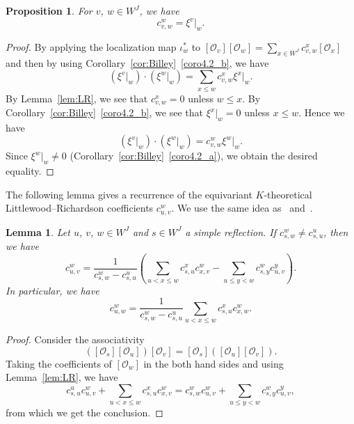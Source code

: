 \documentclass[10pt]{amsart}
\newtheorem{prop}[theo]{Proposition}
\newtheorem{lemm}[theo]{Lemma}
\theoremstyle{definition}
\theoremstyle{remark}
\newcommand\OO{\mathcal{O}}
\begin{document}
\begin{prop}
\label{prop:LR=xi}
For $v$, $w \in W^J$, we have
\begin{equation}
\label{eq:LR=xi}
c^w_{v,w} = \xi^v|_w.
\end{equation}
\end{prop}

\begin{proof}
By applying the localization map $\iota_w^*$ to 
$[\OO_v] [\OO_w] = \sum_{x \in W^J} c^x_{v,w} [\OO_x]$ 
and then by using Corollary~\ref{cor:Billey}~\ref{coro4.2_b}, we have
$$
\left( \xi^v|_w \right) \cdot \left( \xi^w|_w \right)
 =
\sum_{x \le w} c^x_{v,w} \xi^x|_w.
$$
By Lemma~\ref{lem:LR}, we see that $c^x_{v,w} = 0$ unless $w \le x$.
By Corollary~\ref{cor:Billey}~\ref{coro4.2_b}, we see that $\xi^x|_w = 0$ unless $x \le w$.
Hence we have
$$
\left( \xi^v|_w \right) \cdot \left( \xi^w|_w \right)
 =
c^w_{v,w} \xi^w|_w.
$$
Since $\xi^w|_w \neq 0$ (Corollary~\ref{cor:Billey}~\ref{coro4.2_a}), we obtain the desired equality.
\end{proof}

The following lemma gives a recurrence of the equivariant $K$-theoretical 
Little\-wood--Richardson coefficients $c^w_{u,v}$.
We use the same idea as~\cite[Corollary~6.5]{M} and~\cite[Proposition~3.1]{PY}.

\begin{lemm}
\label{lem:recLR}
Let $u$, $v$, $w \in W^J$ and $s \in W^J$ a simple reflection.
If $c^w_{s,w} \neq c^u_{s,u}$, then we have
$$
c^w_{u,v}
 =
\frac{ 1 }
 { c^w_{s,w} - c^u_{s,u} }
\left(
 \sum_{u < x \le w} c^x_{s,u} c^w_{x,v}
 -
 \sum_{u \le y < w} c^w_{s,y} c^y_{u,v}
\right).
$$
In particular, we have
\begin{equation}
\label{eq:recLR}
c^w_{u,w}
 =
\frac{ 1 }
 { c^w_{s,w} - c^u_{s,u} }
\sum_{u < x \le w}
 c^x_{s,u} c^w_{x,w}.
\end{equation}
\end{lemm}

\begin{proof}
Consider the associativity
$$
\left( [\OO_s] [\OO_u] \right) [\OO_v]
 =
[\OO_s] \left( [\OO_u] [\OO_v] \right).
$$
Taking the coefficients of $[\OO_w]$ in the both hand sides and using Lemma~\ref{lem:LR}, 
we have
$$
c^u_{s,u} c^w_{u,v}
 +
\sum_{u < x \le w} c^x_{s,u} c^w_{x,v}
 =
c^w_{s,w} c^w_{u,v}
 +
\sum_{u \le y < w} c^w_{s,y} c^y_{u,v},
$$
from which we get the conclusion. 
\end{proof}
\end{document}
